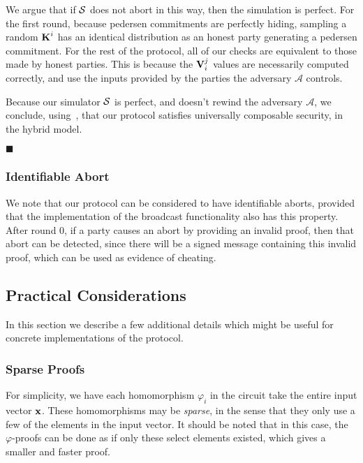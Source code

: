 We argue that if $\mathcal{S}$ does not abort in this way, then the simulation
is perfect. For the first round, because pedersen commitments
are perfectly hiding, sampling a random $\textbf{K}^i$ has an identical
distribution as an honest party generating a pedersen commitment.
For the rest of the protocol, all of our checks are equivalent
to those made by honest parties. This is because the
$\textbf{V}^j_i$ values are necessarily computed correctly, and use
the inputs provided by the parties the adversary $\mathcal{A}$ controls.

Because our simulator $\mathcal{S}$ is perfect, and doesn't
rewind the adversary $\mathcal{A}$, we conclude,
using~\cite{kushilevitz_information-theoretically_2009},
that our protocol
satisfies universally composable security, in the hybrid model.

$\blacksquare$

\subsubsection{Identifiable Abort}

We note that our protocol can be considered to have identifiable
aborts, provided that the implementation of the broadcast functionality
also has this property.
After round $0$, if a party causes an abort by providing an invalid
proof, then that abort can be detected, since there will be
a signed message containing this invalid proof, which can be used
as evidence of cheating.

\subsection{Practical Considerations}

In this section we describe a few additional details which might
be useful for concrete implementations of the protocol.

\subsubsection{Sparse Proofs}

For simplicity, we have each homomorphism $\varphi_i$ in the circuit
take the entire input vector $\textbf{x}$.
These homomorphisms may be \emph{sparse}, in the sense
that they only use a few of the elements in the input vector.
It should be noted that in this case, the $\varphi$-proofs can
be done as if only these select elements existed, which gives
a smaller and faster proof.

